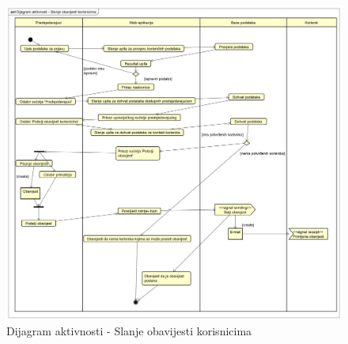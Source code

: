 			 \begin{figure}[H]
			 	\includegraphics[width= 15 cm, height= 25 cm, keepaspectratio]{dijagrami/Dijagram aktivnosti - Slanje obavijesti korisnicima.png} 
			 	\centering
			 	\caption{Dijagram aktivnosti - Slanje obavijesti korisnicima}
			 	\label{fig:act4}
			 \end{figure}
			 
